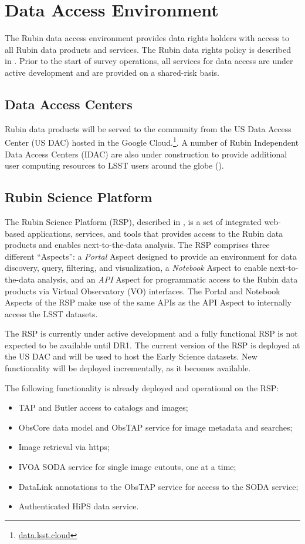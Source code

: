 \section{Data Access Environment} \label{access}

The Rubin data access environment provides data rights holders with access to all Rubin data products and services. 
The Rubin data rights policy is described in .
Prior to the start of survey operations, all services for data access are under active development and are provided on a shared-risk basis. 

\subsection{Data Access Centers}

Rubin data products will be served to the community from the US Data Access Center (US DAC) hosted in the Google Cloud.\footnote{\url{data.lsst.cloud}}.
A number of Rubin Independent Data Access Centers (IDAC) are also under construction to provide additional user computing resources to LSST users around the globe ().

\subsection{Rubin Science Platform}

The Rubin Science Platform (RSP), described in , is a set of integrated web-based applications, services, and tools that provides access to the Rubin data products and enables next-to-the-data analysis. 
The RSP comprises three different ``Aspects'': a \emph{Portal} Aspect designed to provide an environment for data discovery, query, filtering, and visualization, a \emph{Notebook} Aspect to enable next-to-the-data analysis, and an \emph{API} Aspect for programmatic access to the Rubin data products via Virtual Observatory (VO) interfaces.
The Portal and Notebook Aspects of the RSP make use of the same APIs as the API Aspect to internally access the LSST datasets.

The RSP is currently under active development and a fully functional RSP is not expected to be available until DR1. 
The current version of the RSP is deployed at the US DAC and will be used to host the Early Science datasets.
New functionality will be deployed incrementally, as it becomes available. 

The following functionality is already deployed and operational on the RSP:
\begin{itemize}
\item TAP and Butler access to catalogs and images;
\item ObsCore data model and ObsTAP service for image metadata and searches;
\item Image retrieval via https;
\item IVOA SODA service for single image cutouts, one at a time;
\item DataLink annotations to the ObsTAP service for access to the SODA service;
\item Authenticated HiPS data service.
\end{itemize}


